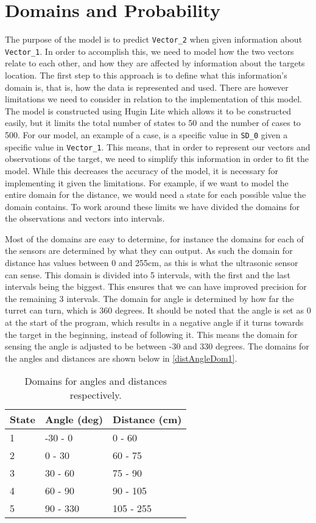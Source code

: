 \section{Domains and Probability}\label{MID}
The purpose of the model is to predict \texttt{Vector\_2} when given information
about \texttt{Vector\_1}. In order to accomplish this, we need to model how the
two vectors relate to each other, and how they are affected by information about the
targets location. The first step to this approach is to define what this
information's domain is, that is, how the data is represented and used.
There are however limitations we need to consider in relation to the
implementation of this model. The model is constructed using Hugin Lite
\citep{Hugin} which allows it to be constructed easily, but it limits the total
number of states to 50 and the number of cases to 500. For our model, an example
of a case, is a specific value in \texttt{SD\_0} given a specific value in
\texttt{Vector\_1}. This means, that in order to represent our vectors and
observations of the target, we need to simplify this information in order to
fit the model. While this decreases the accuracy of the model, it is necessary
for implementing it given the limitations. For example, if we want to model the
entire domain for the distance, we would need a state for each possible value
the domain contains. To work around these limits we have divided the domains
for the observations and vectors into intervals.\nl

Most of the domains are easy to determine, for instance the domains for each of
the sensors are determined by what they can output. As such the domain for
distance has values between 0 and 255cm, as this is what the ultrasonic sensor
can sense. This domain is divided into 5 intervals, with the first and the last
intervals being the biggest. This ensures that we can have improved precision
for the remaining 3 intervals. The domain for angle is determined by how far the
turret can turn, which is 360 degrees. It should be noted that the angle is set
as 0 at the start of the program, which results in a negative angle if it turns
towards the target in the beginning, instead of following it. This means the
domain for sensing the angle is adjusted to be between -30 and 330 degrees. The
domains for the angles and distances are shown below in \autoref{distAngleDom1}. 

\begin{table}[H]
\centering
\begin{tabular}{l|l|l}
State & Angle (deg) & Distance (cm) \\ \hline
1     & -30 - 0     & 0 - 60        \\
2     & 0 - 30      & 60 - 75       \\
3     & 30 - 60     & 75 - 90       \\
4     & 60 - 90     & 90 - 105      \\
5     & 90 - 330    & 105 - 255     
\end{tabular}
\caption{Domains for angles and distances respectively.}
\label{distAngleDom1}
\end{table}

